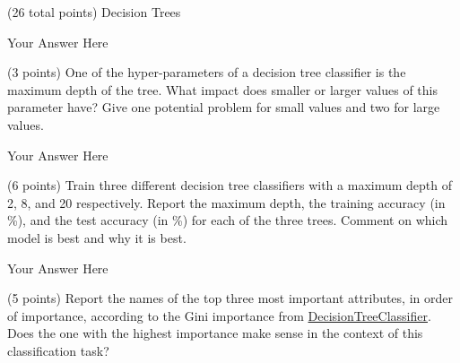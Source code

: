 \documentclass[12pt]{article}
\begin{document}
\begin{question}{(26 total points) Decision Trees}
\begin{subquestion}
\begin{answerbox}{10em}
Your Answer Here
\end{answerbox}



\end{subquestion}


%
%
\begin{subquestion}{(3 points) 
One of the hyper-parameters of a decision tree classifier is the maximum depth of the tree. 
What impact does smaller or larger values of this parameter have? Give one potential problem for small values and two for large values. 
}


\begin{answerbox}{10em}
Your Answer Here
\end{answerbox}



\end{subquestion}


%
%
\begin{subquestion}{(6 points) 
Train three different decision tree classifiers with a maximum depth of 2, 8, and 20 respectively.
Report the maximum depth, the training accuracy (in \%), and the test accuracy (in \%) for each of the three trees.
Comment on which model is best and why it is best. \\
}


\begin{answerbox}{20em}
Your Answer Here
\end{answerbox}



\end{subquestion}


%
%
\begin{subquestion}{(5 points) 
Report the names of the top three most important attributes, in order of importance, according to the Gini importance from \href{https://scikit-learn.org/0.19/modules/generated/sklearn.tree.DecisionTreeClassifier.html}{DecisionTreeClassifier}. 
Does the one with the highest importance make sense in the context of this classification task? \\
}



\end{subquestion}
\end{question}
\end{document}
